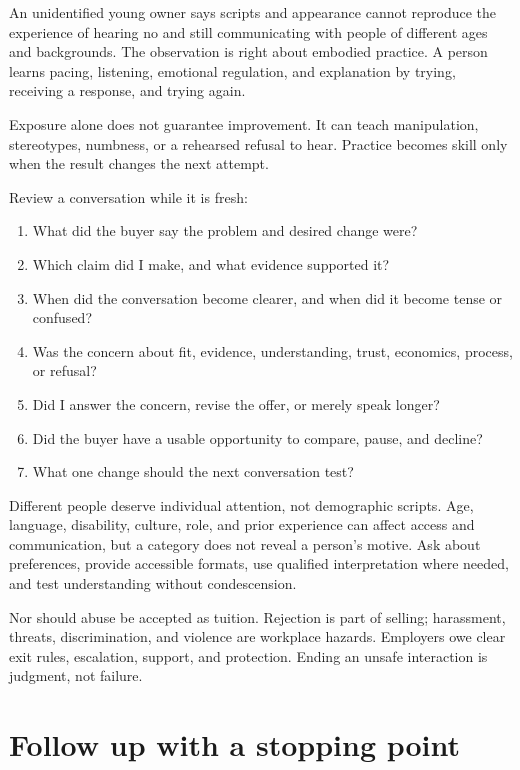 An unidentified young owner says scripts and appearance cannot reproduce the
experience of hearing no and still communicating with people of different
ages and backgrounds. The observation is right about embodied practice. A
person learns pacing, listening, emotional regulation, and explanation by
trying, receiving a response, and trying again.

Exposure alone does not guarantee improvement. It can teach manipulation,
stereotypes, numbness, or a rehearsed refusal to hear. Practice becomes skill
only when the result changes the next attempt.

Review a conversation while it is fresh:

\begin{enumerate}[itemsep=0.12em]
\item What did the buyer say the problem and desired change were?
\item Which claim did I make, and what evidence supported it?
\item When did the conversation become clearer, and when did it become tense or
  confused?
\item Was the concern about fit, evidence, understanding, trust, economics,
  process, or refusal?
\item Did I answer the concern, revise the offer, or merely speak longer?
\item Did the buyer have a usable opportunity to compare, pause, and decline?
\item What one change should the next conversation test?
\end{enumerate}

Different people deserve individual attention, not demographic scripts. Age,
language, disability, culture, role, and prior experience can affect access and
communication, but a category does not reveal a person's motive. Ask about
preferences, provide accessible formats, use qualified interpretation where
needed, and test understanding without condescension.

Nor should abuse be accepted as tuition. Rejection is part of selling;
harassment, threats, discrimination, and violence are workplace hazards.
Employers owe clear exit rules, escalation, support, and protection. Ending an
unsafe interaction is judgment, not failure.

\section{Follow up with a stopping point}

